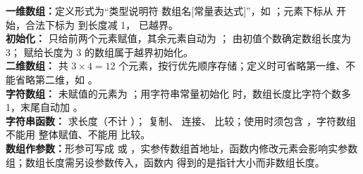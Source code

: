 \documentclass[a4paper,11pt]{article}
\begin{document}

\begin{knowmap}
\textbf{一维数组：}定义形式为“类型说明符 数组名[常量表达式]”，如 ；元素下标从  开始，合法下标为  到长度减 1， 已越界。\\[2pt]
\textbf{初始化：} 只给前两个元素赋值，其余元素自动为 ； 由初值个数确定数组长度为 3； 赋给长度为 3 的数组属于越界初始化。\\[2pt]
\textbf{二维数组：} 共 $3\times4=12$ 个元素，按行优先顺序存储；定义时可省略第一维、不能省略第二维，如 。\\[2pt]
\textbf{字符数组：} 未赋值的元素为 ；用字符串常量初始化  时，数组长度比字符个数多 1，末尾自动加 。\\[2pt]
\textbf{字符串函数：} 求长度（不计 ）； 复制、 连接、 比较；使用时须包含 ，字符数组不能用 \code{=} 整体赋值、不能用 \code{==} 比较。\\[2pt]
\textbf{数组作参数：}形参可写成  或 ，实参传数组首地址，函数内修改元素会影响实参数组；数组长度需另设参数传入，函数内  得到的是指针大小而非数组长度。
\end{knowmap}
\end{document}
